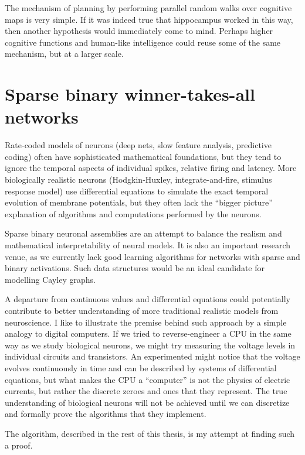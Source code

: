 \documentclass[12pt]{article}
\begin{document}
The mechanism of planning by performing parallel random walks over cognitive maps is very simple. If it was indeed true that hippocampus worked in this way, then another hypothesis would immediately come to mind. Perhaps higher cognitive functions and human-like intelligence could reuse some of the same mechanism, but at a larger scale. 

\section{Sparse binary winner-takes-all networks}

Rate-coded models of neurons (deep nets, slow feature analysis, predictive coding) often have sophisticated mathematical foundations, but they tend to ignore the temporal aspects of individual spikes, relative firing and latency. More biologically realistic neurons (Hodgkin-Huxley, integrate-and-fire, stimulus response model) use differential equations to simulate the exact temporal evolution of membrane potentials, but they often lack the ``bigger picture'' explanation of algorithms and computations performed by the neurons. 

Sparse binary neuronal assemblies are an attempt to balance the realism and mathematical interpretability of neural models. It is also an important research venue, as we currently lack good learning algorithms for networks with sparse and binary activations. Such data structures would be an ideal candidate for modelling Cayley graphs. 

A departure from continuous values and differential equations could potentially contribute to better understanding of more traditional realistic models from neuroscience. I like to illustrate the premise behind such approach by a simple analogy to digital computers. If we tried to reverse-engineer a CPU in the same way as we study biological neurons, we might try measuring the voltage levels in individual circuits and transistors. An experimented might notice that the voltage evolves continuously in time and can be described by systems of differential equations, but what makes the CPU a ``computer'' is not the physics of electric currents, but rather the discrete zeroes and ones that they represent. The true understanding of biological neurons will not be achieved until we can discretize and formally prove the algorithms that they implement. 

The algorithm, described in the rest of this thesis, is my attempt at finding such a proof.
\end{document}
